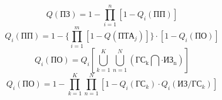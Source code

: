 \documentclass[12pt]{article}
\begin{document}
\[Q(\text{ПЗ}) = 1 - \prod_{i=1}^{n}[1 - Q_i(\text{ПП})]\]
\[Q_i(\text{ПП}) = 1 - \{\prod_{i=1}^{m}[1 - Q(\text{ПТА}_j)]\}\cdot[1 - Q_i(\text{ПО})]\]
\[Q_i(\text{ПО}) = Q_i[\bigcup_{k=1}^{K}\bigcup_{n=1}^{N}(\text{ГС}_{\text{k}}\bigcap\cdot\text{ИЗ}_{\text{n}})]\]
\[Q_i(\text{ПО}) = 1 - \prod_{k=1}^{K}\prod_{n=1}^{N}[1 - Q_i(\text{ГС}_k)\cdot Q_i(\text{ИЗ}/\text{ГС}_k)]\]
\end{document}
